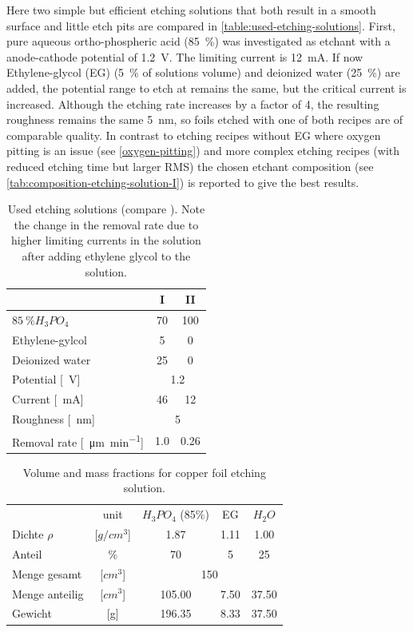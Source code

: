 Here two simple but efficient etching solutions that both result in a smooth surface and little etch pits are compared in \autoref{table:used-etching-solutions}. First, pure aqueous ortho-phospheric acid (\SI{85}{\percent}) was investigated as etchant \cite{jinshan_electrochemical_2004} with a anode-cathode potential of \SI{1.2}{\volt}. The limiting current is \SI{12}{\milli \ampere}. If now Ethylene-glycol (EG) (\SI{5}{\percent} of solutions volume) and deionized water (\SI{25}{\percent}) are added, the potential range to etch at remains the same, but the critical current is increased. Although the etching rate increases by a factor of 4, the resulting roughness remains the same \SI{5}{\nano \meter}, so foils etched with one of both recipes are of comparable quality. In contrast to etching recipes without EG where oxygen pitting is an issue (see \autoref{oxygen-pitting}) and more complex etching recipes (with reduced etching time but larger RMS) the chosen etchant composition (see \autoref{tab:composition-etching-solution-I}) is reported to give the best results.

\begin{table}\centering
	\caption{Used etching solutions (compare \cite[130]{jinshan_electrochemical_2004}). Note the change in the removal rate due to higher limiting currents in the solution after adding ethylene glycol to the solution.}
	\begin{tabular}{lcc}
		& I & II \\ \hline \hline
		$\SI{85}{\percent} H_3PO_4$ & 70 & 100 \\
		Ethylene-gylcol & 5 & 0 \\
		Deionized water & 25 & 0 \\ \hline
		Potential [\SI{}{\V}] & \multicolumn{2}{c}{\SI{1.2}{}} \\
		Current [\SI{}{\mA}] & 46 & 12\\
		Roughness [\SI{}{\nm}] & \multicolumn{2}{c}{\SI{5}{}} \\
		Removal rate [\SI{}{\micro\meter\per\minute}] & \SI{1,0}{} & \SI{0,26}{}\\
	\end{tabular}
	\label{table:used-etching-solutions}
\end{table}

\begin{table}
	\centering
	\caption{Volume and mass fractions for copper foil etching solution.}
	\begin{tabular}{lcccc}
		&unit	&$H_3PO_4$ (85\%)&	EG	&	$H_2O$	\\
		Dichte $\rho$   &[$g/cm^3$]	&	1.87	&	1.11	&	1.00	\\
		Anteil 		& \%		&	70	&	5	&	25	\\ \hline
		Menge gesamt    &[$cm^3$]	&		\multicolumn{3}{c}{150} 	\\
		Menge anteilig  &[$cm^3$]	&	105.00	&	7.50	&	37.50	\\
		Gewicht         &[g]		&	196.35	&	8.33	&	37.50	\\
	\end{tabular}
	\label{tab:composition-etching-solution-I}
\end{table}

